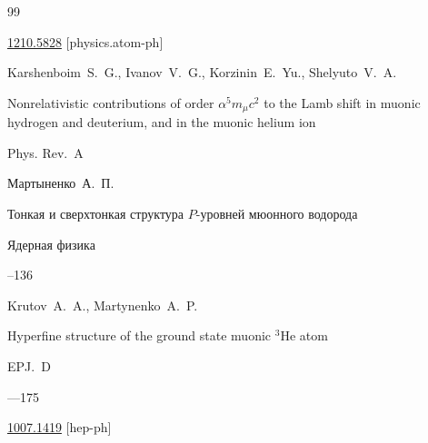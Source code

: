 \begin{thebibliography}{99}



\arxiv \href{http://arxiv.org/abs/1210.5828}{1210.5828} [physics.atom-ph]




\by Karshenboim~S.~G., Ivanov~V.~G., Korzinin~E.~Yu., Shelyuto~V.~A.

\paper Nonrelativistic contributions of order $\alpha^5 m_\mu c^2$ to the Lamb shift in muonic hydrogen and deuterium, and in the muonic helium ion

\jour Phys. Rev.~A









\by Мартыненко~А.~П.

\paper Тонкая и сверхтонкая структура $P$-уровней мюонного водорода

\jour Ядерная физика




--136








\by Krutov~A.~A., Martynenko~A.~P.

\paper Hyperfine structure of the ground state muonic $^3\mathrm{He}$ atom

\jour EPJ.~D




---175


\arxiv \href{http://arxiv.org/abs/1007.1419}{1007.1419} [hep-ph]




\end{thebibliography}
